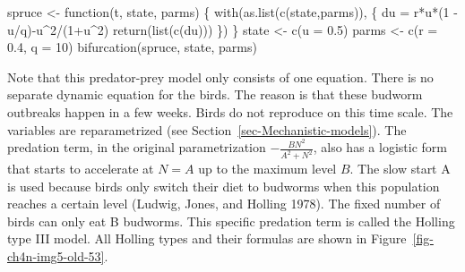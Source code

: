 \documentclass[
  a4paper,
  DIV=11,
  numbers=noendperiod]{scrreprt}
\newenvironment{Shaded}{\begin{snugshade}}{\end{snugshade}}
\newcommand{\AttributeTok}[1]{\textcolor[rgb]{0.40,0.45,0.13}{#1}}
\newcommand{\ControlFlowTok}[1]{\textcolor[rgb]{0.00,0.23,0.31}{#1}}
\newcommand{\DecValTok}[1]{\textcolor[rgb]{0.68,0.00,0.00}{#1}}
\newcommand{\FloatTok}[1]{\textcolor[rgb]{0.68,0.00,0.00}{#1}}
\newcommand{\FunctionTok}[1]{\textcolor[rgb]{0.28,0.35,0.67}{#1}}
\newcommand{\NormalTok}[1]{\textcolor[rgb]{0.00,0.23,0.31}{#1}}
\newcommand{\OtherTok}[1]{\textcolor[rgb]{0.00,0.23,0.31}{#1}}
\newcommand{\SpecialCharTok}[1]{\textcolor[rgb]{0.37,0.37,0.37}{#1}}
\begin{document}
\begin{Shaded}
\begin{Highlighting}[]
\NormalTok{spruce }\OtherTok{\textless{}{-}} \ControlFlowTok{function}\NormalTok{(t, state, parms) \{}
  \FunctionTok{with}\NormalTok{(}\FunctionTok{as.list}\NormalTok{(}\FunctionTok{c}\NormalTok{(state,parms)), \{}
\NormalTok{    du }\OtherTok{=}\NormalTok{ r}\SpecialCharTok{*}\NormalTok{u}\SpecialCharTok{*}\NormalTok{(}\DecValTok{1} \SpecialCharTok{{-}}\NormalTok{ u}\SpecialCharTok{/}\NormalTok{q)}\SpecialCharTok{{-}}\NormalTok{u}\SpecialCharTok{\^{}}\DecValTok{2}\SpecialCharTok{/}\NormalTok{(}\DecValTok{1}\SpecialCharTok{+}\NormalTok{u}\SpecialCharTok{\^{}}\DecValTok{2}\NormalTok{)}
    \FunctionTok{return}\NormalTok{(}\FunctionTok{list}\NormalTok{(}\FunctionTok{c}\NormalTok{(du)))}
\NormalTok{  \})}
\NormalTok{\}}
\NormalTok{state }\OtherTok{\textless{}{-}} \FunctionTok{c}\NormalTok{(}\AttributeTok{u =} \FloatTok{0.5}\NormalTok{)}
\NormalTok{parms }\OtherTok{\textless{}{-}} \FunctionTok{c}\NormalTok{(}\AttributeTok{r =} \FloatTok{0.4}\NormalTok{, }\AttributeTok{q =} \DecValTok{10}\NormalTok{)}
\FunctionTok{bifurcation}\NormalTok{(spruce, state, parms)}
\end{Highlighting}
\end{Shaded}

Note that this predator-prey model only consists of one equation. There
is no separate dynamic equation for the birds. The reason is that these
budworm outbreaks happen in a few weeks. Birds do not reproduce on this
time scale. The variables are reparametrized (see
Section~\ref{sec-Mechanistic-models}). The predation term, in the
original parametrization \(- \frac{BN^{2}}{A^{2} + N^{2}}\), also has a
logistic form that starts to accelerate at \(N = A\) up to the maximum
level \(B\). The slow start A is used because birds only switch their
diet to budworms when this population reaches a certain level (Ludwig,
Jones, and Holling 1978). The fixed number of birds can only eat B
budworms. This specific predation term is called the Holling type III
model. All Holling types and their formulas are shown in
Figure~\ref{fig-ch4n-img5-old-53}.
\end{document}
